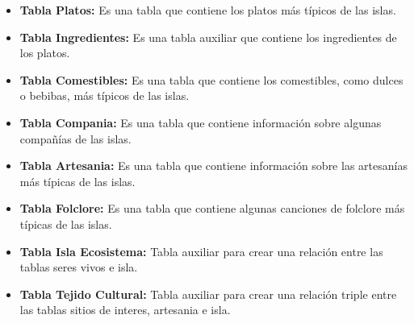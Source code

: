 \documentclass[11pt]{report}
\begin{document}
\begin{itemize}
            \newpage

      \item \textbf{Tabla Platos:} Es una tabla que contiene los platos más típicos de las islas.
            \lstset{style=mystyle}
            

      \item \textbf{Tabla Ingredientes:} Es una tabla auxiliar que contiene los ingredientes de los platos.
            \lstset{style=mystyle}
            

      \item \textbf{Tabla Comestibles:} Es una tabla que contiene los comestibles, como dulces o bebibas, más típicos de las islas.
            \lstset{style=mystyle}
            

      \item \textbf{Tabla Compania:} Es una tabla que contiene información sobre algunas compañías de las islas.
            \lstset{style=mystyle}
            

      \item \textbf{Tabla Artesania:} Es una tabla que contiene información sobre las artesanías más típicas de las islas.
            \lstset{style=mystyle}
            

      \item \textbf{Tabla Folclore:} Es una tabla que contiene algunas canciones de folclore más típicas de las islas.
            \lstset{style=mystyle}
            

            \newpage

      \item \textbf{Tabla Isla Ecosistema:} Tabla auxiliar para crear una relación entre las tablas seres vivos e isla.
            \lstset{style=mystyle}
            

      \item \textbf{Tabla Tejido Cultural:} Tabla auxiliar para crear una relación triple entre las tablas sitios de interes, artesania e isla.
            \lstset{style=mystyle}
            


\end{itemize}
\end{document}
